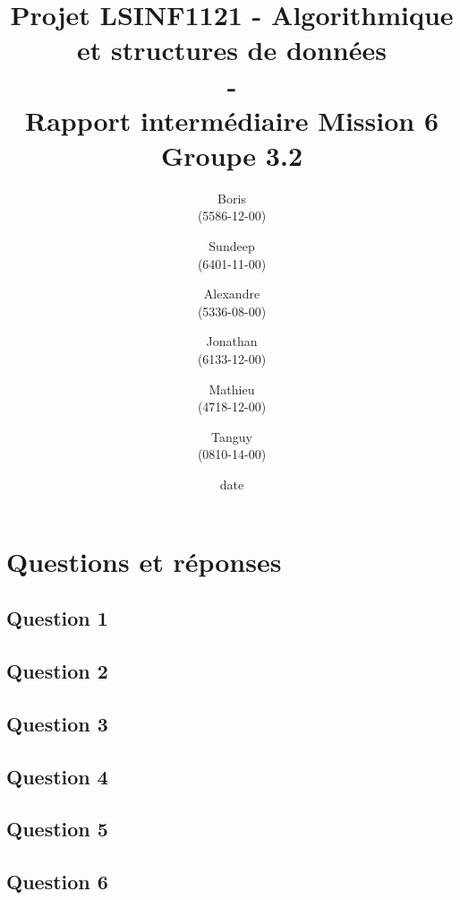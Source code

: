 \documentclass[11pt]{article}
\title{\textbf{Projet LSINF1121 -  Algorithmique et structures de données\\ - \\ Rapport intermédiaire Mission 6} \\ {\large Groupe 3.2}}
\author{Boris \bsc{Dehem} \\(5586-12-00)\and Sundeep \bsc{Dhillon} \\(6401-11-00)\and Alexandre \bsc{Hauet} \\ (5336-08-00) \and Jonathan \bsc{Powell}\\(6133-12-00)\and Mathieu \bsc{Rosar} \\ (4718-12-00)\and Tanguy \bsc{Vaessen} \\ (0810-14-00)}
\date{date}
\date{\vspace*{25mm}
\texttt{[image: logo.jpg]}\\
		\vspace*{30mm}
		\begin{center}
		Année académique 2014-2015 \\	
		\end{center}}
\begin{document}
\thispagestyle{empty}

\maketitle
\thispagestyle{empty}
\section*{Questions et réponses}

\subsection*{Question 1}

\newpage
\subsection*{Question 2}

\newpage
\subsection*{Question 3}

\newpage
\subsection*{Question 4}

\newpage
\subsection*{Question 5}

\newpage
\subsection*{Question 6}

\newpage
\end{document}
